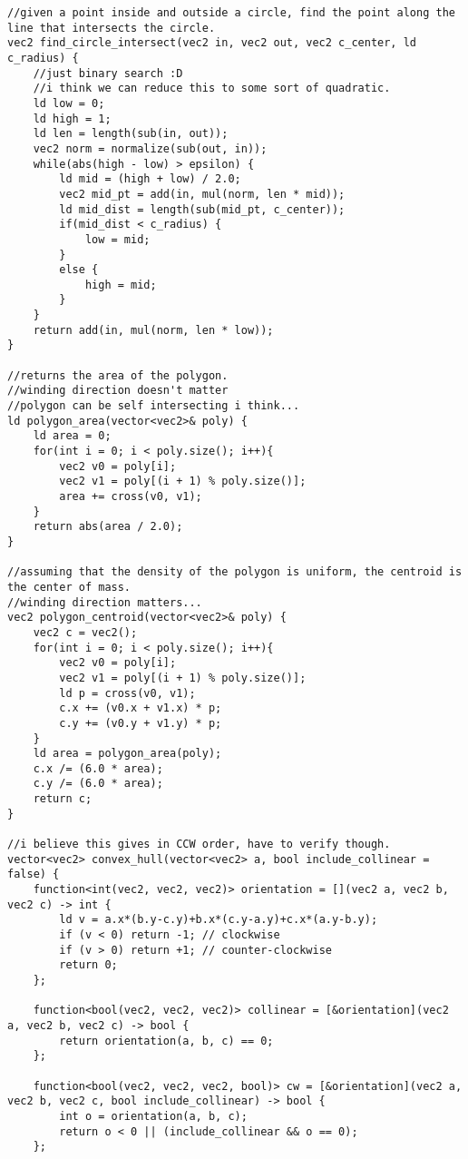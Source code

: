 \documentclass[8pt, headheight=10pt]{scrartcl}
\begin{document}
\begin{multicols*}{3}
\begin{lstlisting}
//given a point inside and outside a circle, find the point along the line that intersects the circle.
vec2 find_circle_intersect(vec2 in, vec2 out, vec2 c_center, ld c_radius) {
    //just binary search :D
    //i think we can reduce this to some sort of quadratic. 
    ld low = 0;
    ld high = 1;
    ld len = length(sub(in, out));
    vec2 norm = normalize(sub(out, in));
    while(abs(high - low) > epsilon) {
        ld mid = (high + low) / 2.0;
        vec2 mid_pt = add(in, mul(norm, len * mid));
        ld mid_dist = length(sub(mid_pt, c_center));
        if(mid_dist < c_radius) {
            low = mid;
        }
        else {
            high = mid;
        }
    }
    return add(in, mul(norm, len * low));
}

//returns the area of the polygon. 
//winding direction doesn't matter
//polygon can be self intersecting i think...
ld polygon_area(vector<vec2>& poly) {
    ld area = 0;
    for(int i = 0; i < poly.size(); i++){
        vec2 v0 = poly[i];
        vec2 v1 = poly[(i + 1) % poly.size()];
        area += cross(v0, v1);
    }
    return abs(area / 2.0);
}

//assuming that the density of the polygon is uniform, the centroid is the center of mass.
//winding direction matters...
vec2 polygon_centroid(vector<vec2>& poly) {
    vec2 c = vec2();
    for(int i = 0; i < poly.size(); i++){
        vec2 v0 = poly[i];
        vec2 v1 = poly[(i + 1) % poly.size()];
        ld p = cross(v0, v1);
        c.x += (v0.x + v1.x) * p;
        c.y += (v0.y + v1.y) * p;
    }
    ld area = polygon_area(poly);
    c.x /= (6.0 * area);
    c.y /= (6.0 * area);
    return c;
}

//i believe this gives in CCW order, have to verify though. 
vector<vec2> convex_hull(vector<vec2> a, bool include_collinear = false) {
    function<int(vec2, vec2, vec2)> orientation = [](vec2 a, vec2 b, vec2 c) -> int {
        ld v = a.x*(b.y-c.y)+b.x*(c.y-a.y)+c.x*(a.y-b.y);
        if (v < 0) return -1; // clockwise
        if (v > 0) return +1; // counter-clockwise
        return 0;
    };

    function<bool(vec2, vec2, vec2)> collinear = [&orientation](vec2 a, vec2 b, vec2 c) -> bool {
        return orientation(a, b, c) == 0;
    };

    function<bool(vec2, vec2, vec2, bool)> cw = [&orientation](vec2 a, vec2 b, vec2 c, bool include_collinear) -> bool {
        int o = orientation(a, b, c);
        return o < 0 || (include_collinear && o == 0);
    };


\end{lstlisting}
\end{multicols*}
\end{document}
